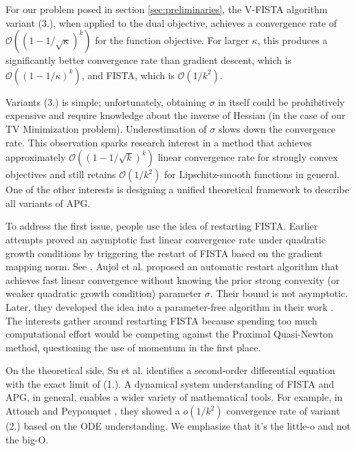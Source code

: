 \documentclass[]{article}
\theoremstyle{definition}
\numberwithin{equation}{subsection}
\begin{document}
        For our problem posed in section \ref*{sec:preliminaries}, the V-FISTA algorithm variant (3.), when applied to the dual objective, achieves a convergence rate of $\mathcal O((1 - 1/\sqrt{\kappa})^k)$ for the function objective. 
        For larger $\kappa$, this produces a significantly better convergence rate than gradient descent, which is $\mathcal O((1 - 1/\kappa)^k)$, and FISTA, which is $\mathcal O(1/k^2)$. 
        \par
        Variants (3.) is simple; unfortunately, obtaining $\sigma$ in itself could be prohibitively expensive and require knowledge about the inverse of Hessian (in the case of our TV Minimization problem). 
        Underestimation of $\sigma$ slows down the convergence rate. 
        This observation sparks research interest in a method that achieves approximately $\mathcal O((1 - 1/\sqrt{k})^k)$ linear convergence rate for strongly convex objectives and still retains $\mathcal O(1/k^2)$ for Lipschitz-smooth functions in general. 
        One of the other interests is designing a unified theoretical framework to describe all variants of APG. 
        \par
        To address the first issue, people use the idea of restarting FISTA.
        Earlier attempts proved an asymptotic fast linear convergence rate under quadratic growth conditions by triggering the restart of FISTA based on the gradient mapping norm. 
        See \cite{alamo_gradient_2019}\cite{fercoq_adaptive_2019}. 
        Aujol et al.\cite{aujol_fista_2022} proposed an automatic restart algorithm that achieves fast linear convergence without knowing the prior strong convexity (or weaker quadratic growth condition) parameter $\sigma$. 
        Their bound is not asymptotic. 
        Later, they developed the idea into a parameter-free algorithm in their work \cite{aujol_parameter-free_2023}. 
        The interests gather around restarting FISTA because spending too much computational effort would be competing against the Proximal Quasi-Newton method, questioning the use of momentum in the first place. 
        \par
        On the theoretical side, Su et al. \cite{su_differential_2015} identifies a second-order differential equation with the exact limit of (1.). 
        A dynamical system understanding of FISTA and APG, in general, enables a wider variety of mathematical tools. 
        For example, in Attouch and Peypouquet \cite{attouch_rate_2016}, they showed a $o(1/k^2)$ convergence rate of variant (2.) based on the ODE understanding. 
        We emphasize that it's the little-o and not the big-O. 
\end{document}
